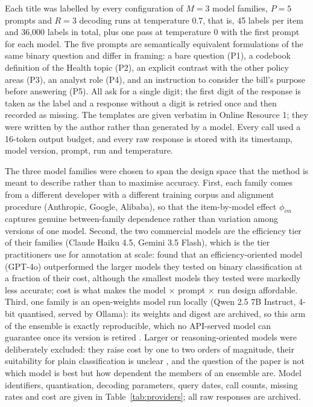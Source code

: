 Each title was labelled by every configuration of $M = 3$ model families, $P = 5$ prompts and
$R = 3$ decoding runs at temperature 0.7, that is, 45 labels per item and 36,000 labels in total,
plus one pass at temperature 0 with the first prompt for each model. The five prompts are
semantically equivalent formulations of the same binary question and differ in framing: a bare
question (P1), a codebook definition of the Health topic (P2), an explicit contrast with the
other policy areas (P3), an analyst role (P4), and an instruction to consider the bill's purpose
before answering (P5). All ask for a single digit; the first digit of the response is taken as
the label and a response without a digit is retried once and then recorded as missing. The
templates are given verbatim in Online Resource 1; they were written by the author rather than
generated by a model. Every call used a 16-token output budget, and every raw response is stored
with its timestamp, model version, prompt, run and temperature.

The three model families were chosen to span the design space that the method is meant to
describe rather than to maximise accuracy. First, each family comes from a different developer
with a different training corpus and alignment procedure (Anthropic, Google, Alibaba), so that the
item-by-model effect $\phi_{im}$ captures genuine between-family dependence rather than variation
among versions of one model. Second, the two commercial models are the efficiency tier of their
families (Claude Haiku 4.5, Gemini 3.5 Flash), which is the tier practitioners use for annotation
at scale: \citet{Carlson2025} found that an efficiency-oriented model (GPT-4o) outperformed the larger models they tested on binary classification at a fraction of their cost, although the smallest models they tested were markedly less accurate; cost is what makes the model $\times$ prompt
$\times$ run design affordable. Third, one family is an open-weights model run locally (Qwen 2.5
7B Instruct, 4-bit quantised, served by Ollama): its weights and digest are archived, so this arm
of the ensemble is exactly reproducible, which no API-served model can guarantee once its version
is retired \citep{Barrie2025}. Larger or reasoning-oriented models were deliberately excluded:
they raise cost by one to two orders of magnitude, their suitability for plain classification is
unclear \citep{Carlson2025}, and the question of the paper is not which model is best but how
dependent the members of an ensemble are. Model identifiers, quantisation, decoding parameters,
query dates, call counts, missing rates and cost are given in Table~\ref{tab:providers}; all raw
responses are archived.

